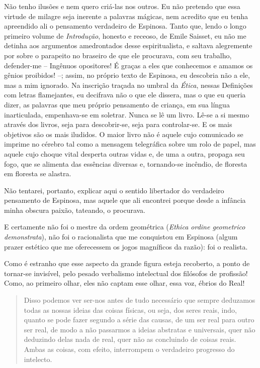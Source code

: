 Não tenho ilusões e nem quero criá-las nos outros. Eu não pretendo que
essa virtude de milagre seja inerente a palavras mágicas, nem acredito
que eu tenha apreendido ali o pensamento verdadeiro de Espinosa. Tanto
que, lendo o longo primeiro volume de \emph{Introdução}, honesto e
receoso, de Emile Saisset, eu não me detinha aos argumentos amedrontados
desse espiritualista, e saltava alegremente por sobre o parapeito no
braseiro de que ele procurava, com seu trabalho, defender-me -- Ingênuos
opositores! É graças a eles que conhecemos e amamos os gênios proibidos!
--; assim, no próprio texto de Espinosa, eu descobria não a ele, mas a
mim ignorado. Na inscrição traçada no umbral da \emph{Ética}, nessas
Definições com letras flamejantes, eu decifrava não o que ele dissera,
mas o que eu queria dizer, as palavras que meu próprio pensamento de
criança, em sua língua inarticulada, empenhava-se em soletrar. Nunca se
lê um livro. Lê-se a si mesmo através dos livros, seja para
descobrir-se, seja para controlar-se. E os mais objetivos são os mais
iludidos. O maior livro não é aquele cujo comunicado se imprime no
cérebro tal como a mensagem telegráfica sobre um rolo de papel, mas
aquele cujo choque vital desperta outras vidas e, de uma a outra,
propaga seu fogo, que se alimenta das essências diversas e, tornando-se
incêndio, de floresta em floresta se alastra.

Não tentarei, portanto, explicar aqui o sentido libertador do verdadeiro
pensamento de Espinosa, mas aquele que ali encontrei porque desde a
infância minha obscura paixão, tateando, o procurava.

E certamente não foi o mestre da ordem geométrica (\emph{Ethica ordine
geometrico demonstrata}), não foi o racionalista que me conquistou em
Espinosa (algum prazer estético que me oferecessem os jogos magníficos
da razão): foi o realista.

Como é estranho que esse aspecto da grande figura esteja recoberto, a
ponto de tornar-se invisível, pelo pesado verbalismo intelectual dos
filósofos de profissão! Como, ao primeiro olhar, eles não captam esse
olhar, essa voz, ébrios do Real!

\begin{quote}
Disso podemos ver ser-nos antes de tudo necessário que sempre deduzamos
todas as nossas ideias das coisas físicas, ou seja, dos seres reais,
indo, quanto se pode fazer segundo a série das causas, de um ser real
para outro ser real, de modo a não passarmos a ideias abstratas e
universais, quer não deduzindo delas nada de real, quer não as
concluindo de coisas reais. Ambas as coisas, com efeito, interrompem o
verdadeiro progresso do intelecto.
\end{quote}


